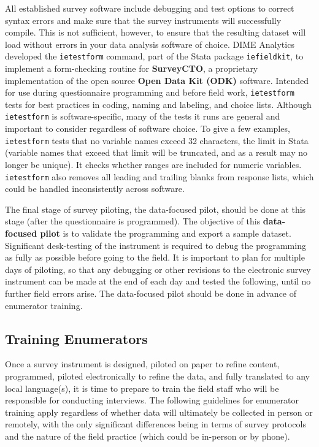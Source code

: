 All established survey software include debugging and test options
to correct syntax errors and make sure that
the survey instruments will successfully compile.
This is not sufficient, however, to ensure that the resulting dataset
will load without errors in your data analysis software of choice.
DIME Analytics developed the \texttt{ietestform} command,
part of the Stata package \texttt{iefieldkit},
to implement a form-checking routine for \textbf{SurveyCTO},
a proprietary implementation of the open source \textbf{Open Data Kit (ODK)} software.
Intended for use during questionnaire programming and before field work,
\texttt{ietestform} tests for best practices
in coding, naming and labeling, and choice lists.
Although \texttt{ietestform} is software-specific,
many of the tests it runs are general and important to consider regardless of software choice.
To give a few examples, \texttt{ietestform} tests that no variable names exceed
32 characters, the limit in Stata (variable names that exceed that limit will
be truncated, and as a result may no longer be unique).
It checks whether ranges are included for numeric variables.
\texttt{ietestform} also removes all leading and trailing blanks from response lists,
which could be handled inconsistently across software.

The final stage of survey piloting, the data-focused pilot, should be done at this stage (after the questionnaire is programmed).
The objective of this \textbf{data-focused pilot}
is to validate the programming and export a sample dataset.
Significant desk-testing of the instrument is required to debug the programming
as fully as possible before going to the field.
It is important to plan for multiple days of piloting,
so that any debugging or other revisions to the electronic survey instrument
can be made at the end of each day and tested the following, until no further field errors arise.
The data-focused pilot should be done in advance of enumerator training.

\subsection{Training Enumerators}
Once a survey instrument is designed, piloted on paper to refine content, 
programmed, piloted electronically to refine the data,
and fully translated to any local language(s), 
it is time to prepare to train the field staff who will be 
responsible for conducting interviews. 
The following guidelines for enumerator training apply regardless of 
whether data will ultimately be collected in person or remotely,
with the only significant differences being in terms of survey protocols and 
the nature of the field practice (which could be in-person or by phone).

